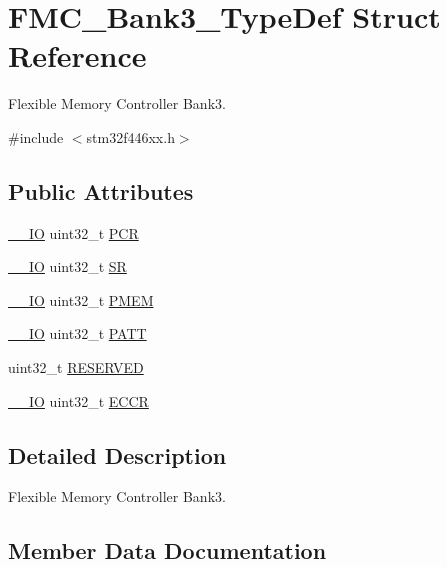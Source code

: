 \hypertarget{struct_f_m_c___bank3___type_def}{}\section{F\+M\+C\+\_\+\+Bank3\+\_\+\+Type\+Def Struct Reference}
\label{struct_f_m_c___bank3___type_def}


Flexible Memory Controller Bank3.  




{\ttfamily \#include $<$stm32f446xx.\+h$>$}

\subsection*{Public Attributes}
\begin{DoxyCompactItemize}
\item 
\hyperlink{core__sc300_8h_aec43007d9998a0a0e01faede4133d6be}{\+\_\+\+\_\+\+IO} uint32\+\_\+t \hyperlink{struct_f_m_c___bank3___type_def_ad7e74bf59532cbe667231e321bdf0de2}{P\+CR}
\item 
\hyperlink{core__sc300_8h_aec43007d9998a0a0e01faede4133d6be}{\+\_\+\+\_\+\+IO} uint32\+\_\+t \hyperlink{struct_f_m_c___bank3___type_def_a43af4c901144f747741adbf1a479586a}{SR}
\item 
\hyperlink{core__sc300_8h_aec43007d9998a0a0e01faede4133d6be}{\+\_\+\+\_\+\+IO} uint32\+\_\+t \hyperlink{struct_f_m_c___bank3___type_def_af34d82c290385286c11648a983ab3e71}{P\+M\+EM}
\item 
\hyperlink{core__sc300_8h_aec43007d9998a0a0e01faede4133d6be}{\+\_\+\+\_\+\+IO} uint32\+\_\+t \hyperlink{struct_f_m_c___bank3___type_def_a4cca3d0ef62651cc93d4070278bb5376}{P\+A\+TT}
\item 
uint32\+\_\+t \hyperlink{struct_f_m_c___bank3___type_def_a778e98be0b9c57bec95e25b2be2ecd72}{R\+E\+S\+E\+R\+V\+ED}
\item 
\hyperlink{core__sc300_8h_aec43007d9998a0a0e01faede4133d6be}{\+\_\+\+\_\+\+IO} uint32\+\_\+t \hyperlink{struct_f_m_c___bank3___type_def_ab6c1398fb7158f021ab78a4231c67054}{E\+C\+CR}
\end{DoxyCompactItemize}


\subsection{Detailed Description}
Flexible Memory Controller Bank3. 

\subsection{Member Data Documentation}
